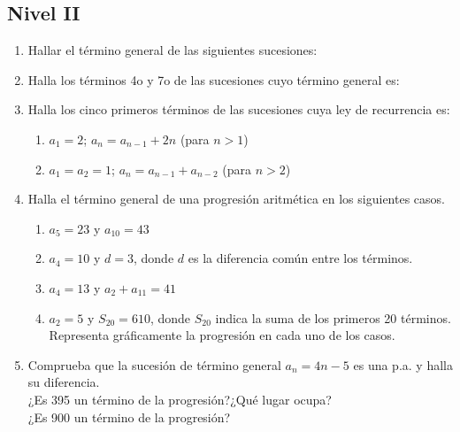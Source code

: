 \documentclass{article}
\begin{document}
\subsection*{Nivel II}
\begin{enumerate}
\item Hallar el término general de las siguientes sucesiones:
\begin{enumerate}
\end{enumerate}
\item Halla los términos 4o y 7o de las sucesiones cuyo término general es:
\begin{enumerate}
\end{enumerate}
\item Halla los cinco primeros términos de las sucesiones cuya ley de recurrencia es:
\begin{enumerate}
\item $a_{1}=2$; $a_{n}=a_{n-1}+2n$ (para $n>1$)
\item $a_{1}=a_{2}=1$; $a_{n}=a_{n-1}+a_{n-2}$ (para $n>2$)
\end{enumerate}
\item Halla el término general de una progresión aritmética en los siguientes casos.
\begin{enumerate}
\item $a_{5}=23$ y $a_{10}=43$
\item $a_{4}=10$ y $d=3$, donde $d$ es la diferencia común entre los términos.
\item $a_{4}=13$ y $a_{2}+a_{11}=41$
\item $a_{2}=5$ y $S_{20}=610$, donde $S_{20}$ indica la suma de los primeros 20 términos.\\
Representa gráficamente la progresión en cada uno de los casos.
\end{enumerate}
\item Comprueba que la sucesión de término general $a_n = 4n - 5$ es una p.a. y halla su diferencia.\\
¿Es 395 un término de la progresión?¿Qué lugar ocupa?\\
¿Es 900 un término de la progresión?
\end{enumerate}
\end{document}

